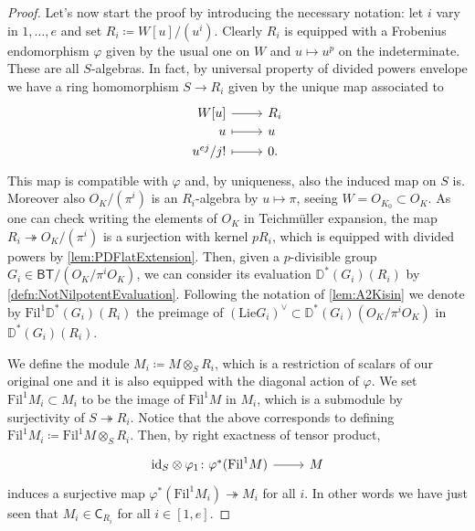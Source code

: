 \begin{proof}
Let's now start the proof by introducing the necessary notation:
let $i$ vary in $1, \ldots, e$ and set $R_i \coloneqq W[u]/ (u^i)$.
Clearly $R_i$ is equipped with a Frobenius endomorphism $\varphi$
given by the usual one on $W$ and $u \mapsto u^p$ on the indeterminate.
These are all $S$-algebras.
In fact, by universal property of divided powers envelope
we have a ring homomorphism $S \to R_i$ given by the unique map associated to
\begin{equation*}
\begin{tikzcd}[row sep = 0ex
	,/tikz/column 1/.append style={anchor=base east}
	,/tikz/column 2/.append style={anchor=base west}]
	W[u] \arrow[r, "", rightarrow] &
	R_i \\
	u \arrow[r, "", mapsto] & u \\
	u^{ej} / j!  \arrow[r, "", mapsto] & 0
.\end{tikzcd}
\end{equation*} 
This map is compatible with $\varphi$ and, by uniqueness, also
the induced map on $S$ is.
Moreover also $O_K/ (\pi^i)$ is an $R_i$-algebra by $u \mapsto \pi$,
seeing $W = O_{K_0} \subset O_K$.
As one can check writing the elements of $O_K$ in Teichmüller expansion,
the map $R_i \twoheadrightarrow O_K/ (\pi^i)$ is a surjection
with kernel $pR_i$, which is equipped with divided powers by \cref{lem:PDFlatExtension}.
Then, given a $p$-divisible group $G_i \in \mathsf{BT}/ (O_K/ \pi^iO_K)$,
we can consider its evaluation $\mathbb{D}^*(G_i)(R_i)$ by \cref{defn:NotNilpotentEvaluation}.
Following the notation of \cref{lem:A2Kisin}
we denote by $\mathrm{Fil}^1\mathbb{D}^*(G_i)(R_i)$
the preimage of $\left( \mathrm{Lie}G_i \right)^\vee \subset \mathbb{D}^*(G_i)(O_K/\pi^iO_K)$
in $\mathbb{D}^*(G_i)(R_i)$.

We define the module $M_i \coloneqq M \otimes_S R_i$,
which is a restriction of scalars of our original one and
it is also equipped with the diagonal action of $\varphi$.
We set $\mathrm{Fil}^1 M_i \subset M_i$
to be the image of $\mathrm{Fil}^1 M$ in $M_i$, which is a submodule
by surjectivity of $S \twoheadrightarrow R_i$.
Notice that the above corresponds to defining $\mathrm{Fil}^1 M_i \coloneqq
\mathrm{Fil}^1 M \otimes_S R_i$.
Then, by right exactness of tensor product, 
\begin{equation*}
\begin{tikzcd}[row sep = 0ex
	,/tikz/column 1/.append style={anchor=base east}
	,/tikz/column 2/.append style={anchor=base west}]
	\mathrm{id}_{ S } \otimes \varphi_1
	\colon 
	\varphi^*(\mathrm{Fil}^1 M)\arrow[r, "", rightarrow] &
	M
\end{tikzcd}
\end{equation*} 
induces a surjective map $\varphi^*(\mathrm{Fil}^1 M_i) \twoheadrightarrow M_i$
for all $i$.
In other words we have just seen that
$M_i \in \mathsf{C}_{R_i}$ for all $i \in [1,e]$.


\end{proof}
